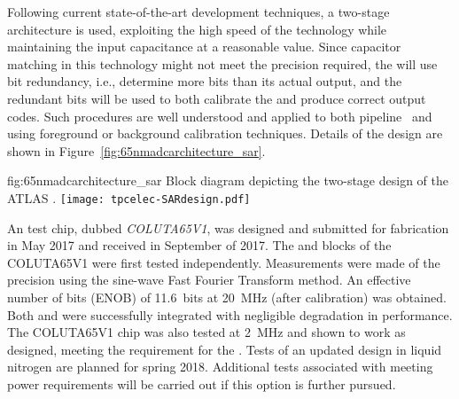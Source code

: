 Following current state-of-the-art  development techniques, a two-stage 
 architecture is used, exploiting the high speed of the technology while maintaining the  input 
capacitance at a reasonable value. Since capacitor matching in this technology might not meet the 
precision required, the  will use bit redundancy, i.e., determine more bits than its actual output, 
and the redundant bits will be used to both calibrate the  and produce correct output codes. 
Such procedures are well understood and applied to both pipeline~\cite{Kuppambatti:2013nfa} and 
~\cite{5999734}  using foreground or background calibration techniques. Details of the  design are shown in Figure~\ref{fig:65nmadcarchitecture_sar}. 

\begin{dunefigure}
{fig:65nmadcarchitecture_sar}
{Block diagram depicting the two-stage  design of the ATLAS  .}
\texttt{[image: tpcelec-SARdesign.pdf]}
\end{dunefigure}

An  test chip, dubbed \textit{COLUTA65V1}, was designed and submitted for fabrication in May 2017 and received
in September of 2017.  The  and  blocks of the COLUTA65V1 were first tested independently. Measurements were made of the  precision using the sine-wave Fast Fourier Transform method. An effective number of bits
(ENOB) of \SI{11.6}{bits} at \SI{20}{MHz} (after calibration) was obtained.
Both  and  were successfully integrated with negligible degradation in performance. The COLUTA65V1 chip was also tested at \SI{2}{MHz} and shown to work as designed, meeting the requirement for the . %
Tests of an updated design in liquid nitrogen are planned for spring 2018. Additional tests associated with meeting power requirements will be carried out if this  option is further pursued.
